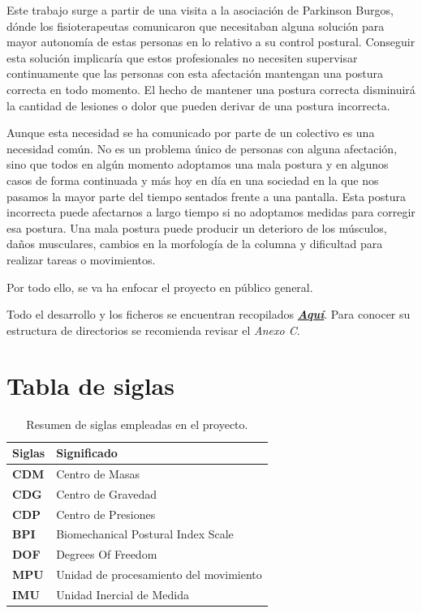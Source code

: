 
Este trabajo surge a partir de una visita a la asociación de Parkinson Burgos\cite{ParkinsonBurgos}, dónde los fisioterapeutas comunicaron que necesitaban alguna solución para mayor autonomía de estas personas en lo relativo a su control postural. Conseguir esta solución implicaría que estos profesionales no necesiten supervisar continuamente que las personas con esta afectación mantengan una postura correcta en todo momento. El hecho de mantener una postura correcta disminuirá la cantidad de lesiones o dolor que pueden derivar de una postura incorrecta.

Aunque esta necesidad se ha comunicado por parte de un colectivo es una necesidad común. No es un problema único de personas con alguna afectación, sino que todos en algún momento adoptamos una mala postura y en algunos casos de forma continuada y más hoy en día en una sociedad en la que nos pasamos la mayor parte del tiempo sentados frente a una pantalla. Esta postura incorrecta puede afectarnos a largo tiempo si no adoptamos medidas para corregir esa postura. Una mala postura puede producir un deterioro de los músculos, daños musculares, cambios en la morfología de la columna y dificultad para realizar tareas o movimientos. 

Por todo ello, se va ha enfocar el proyecto en público general.

Todo el desarrollo y los ficheros se encuentran recopilados \href{https://github.com/NaiaraGadea/TFG_DispositivoDeControlPostural}{\textbf{\textit{Aquí}}}. Para conocer su estructura de directorios se recomienda revisar el \textit{Anexo C}.

\clearpage
\section{Tabla de siglas}
\begin{table}[h!]
\centering
\begin{tabular}{ m{3cm} m{6cm}  } 
\hline
\cellcolor[HTML]{EFEFEF}\textbf{Siglas} & \cellcolor[HTML]{EFEFEF}\textbf{Significado}\\
\hline

\textbf{CDM}   & {Centro de Masas} \\
\textbf{CDG}   & {Centro de Gravedad} \\
\textbf{CDP}   & {Centro de Presiones} \\
\textbf{BPI}   & {Biomechanical Postural Index Scale} \\
\textbf{DOF}   & {Degrees Of Freedom} \\
\textbf{MPU}   & {Unidad de procesamiento del movimiento} \\
\textbf{IMU}   & {Unidad Inercial de Medida} \\


\hline
\end{tabular}
\caption{Resumen de siglas empleadas en el proyecto.}
\end{table}



